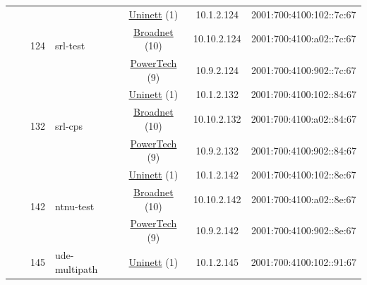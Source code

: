 \begin{small}
\begin{center}
\begin{longtable}{|c|c|c|c|c|c|c|c|}
  &  & \multirow{3}{*}{\tiny{124}} & \multicolumn{1}{|l|}{\multirow{3}{*}{\tiny{srl-test}}} & \multicolumn{2}{|c|}{\tiny{\href{https://www.uninett.no}{Uninett} (1)}} & \tiny{10.1.2.124} & \tiny{2001:700:4100:102::7c:67} \\* \cline{5-5}\cline{6-6}\cline{7-7}\cline{8-8}
  &  &  &  & \multicolumn{2}{|c|}{\tiny{\href{https://www.broadnet.no}{Broadnet} (10)}} & \tiny{10.10.2.124} & \tiny{2001:700:4100:a02::7c:67} \\* \cline{5-5}\cline{6-6}\cline{7-7}\cline{8-8}
  &  &  &  & \multicolumn{2}{|c|}{\tiny{\href{http://www.powertech.no}{PowerTech} (9)}} & \tiny{10.9.2.124} & \tiny{2001:700:4100:902::7c:67} \\* \cline{3-3}\cline{4-4}\cline{5-5}\cline{6-6}\cline{7-7}\cline{8-8}
  &  & \multirow{3}{*}{\tiny{132}} & \multicolumn{1}{|l|}{\multirow{3}{*}{\tiny{srl-cps}}} & \multicolumn{2}{|c|}{\tiny{\href{https://www.uninett.no}{Uninett} (1)}} & \tiny{10.1.2.132} & \tiny{2001:700:4100:102::84:67} \\* \cline{5-5}\cline{6-6}\cline{7-7}\cline{8-8}
  &  &  &  & \multicolumn{2}{|c|}{\tiny{\href{https://www.broadnet.no}{Broadnet} (10)}} & \tiny{10.10.2.132} & \tiny{2001:700:4100:a02::84:67} \\* \cline{5-5}\cline{6-6}\cline{7-7}\cline{8-8}
  &  &  &  & \multicolumn{2}{|c|}{\tiny{\href{http://www.powertech.no}{PowerTech} (9)}} & \tiny{10.9.2.132} & \tiny{2001:700:4100:902::84:67} \\* \cline{3-3}\cline{4-4}\cline{5-5}\cline{6-6}\cline{7-7}\cline{8-8}
  &  & \multirow{3}{*}{\tiny{142}} & \multicolumn{1}{|l|}{\multirow{3}{*}{\tiny{ntnu-test}}} & \multicolumn{2}{|c|}{\tiny{\href{https://www.uninett.no}{Uninett} (1)}} & \tiny{10.1.2.142} & \tiny{2001:700:4100:102::8e:67} \\* \cline{5-5}\cline{6-6}\cline{7-7}\cline{8-8}
  &  &  &  & \multicolumn{2}{|c|}{\tiny{\href{https://www.broadnet.no}{Broadnet} (10)}} & \tiny{10.10.2.142} & \tiny{2001:700:4100:a02::8e:67} \\* \cline{5-5}\cline{6-6}\cline{7-7}\cline{8-8}
  &  &  &  & \multicolumn{2}{|c|}{\tiny{\href{http://www.powertech.no}{PowerTech} (9)}} & \tiny{10.9.2.142} & \tiny{2001:700:4100:902::8e:67} \\* \cline{3-3}\cline{4-4}\cline{5-5}\cline{6-6}\cline{7-7}\cline{8-8}
  &  & \multirow{3}{*}{\tiny{145}} & \multicolumn{1}{|l|}{\multirow{3}{*}{\tiny{ude-multipath}}} & \multicolumn{2}{|c|}{\tiny{\href{https://www.uninett.no}{Uninett} (1)}} & \tiny{10.1.2.145} & \tiny{2001:700:4100:102::91:67} \\* \cline{5-5}\cline{6-6}\cline{7-7}\cline{8-8}

\end{longtable}
\end{center}
\end{small}
